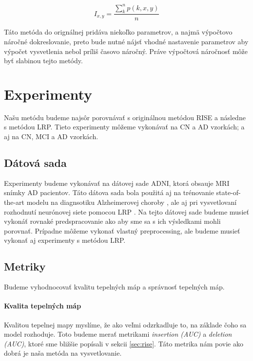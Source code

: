 \begin{equation}
    I_{x, y} = \frac{\sum_{k}^{n} p(k, x, y)}{n}
    \label{eq:risei_heatmap_1}
\end{equation}

Táto metóda do orignálnej pridáva niekoľko parametrov, a najmä výpočtovo náročné dokreslovanie, preto bude nutné nájsť vhodné nastavenie parametrov aby výpočet vysvetlenia nebol príliš časovo náročný. Práve výpočtová náročnosť môže byť slabinou tejto metódy.

\section{Experimenty}

Našu metódu budeme najsôr porovnávať s originálnou metódou RISE a následne s metódou LRP. Tieto experimenty môžeme vykonávať na CN a AD vzorkách; a aj na CN, MCI a AD vzorkách.

\subsection{Dátová sada} Experimenty budeme vykonávať na dátovej sade ADNI, ktorá obsauje MRI snímky AD pacientov. Táto dátova sada bola použitá aj na trénovanie state-of-the-art modelu na diagnsotiku Alzheimerovej choroby \cite{esmaeilzadeh2018end}, ale aj pri vysvetlovaní rozhodnutí neurónovej siete pomocou LRP \cite{bohle2019layer}. Na tejto dátovej sade budeme musieť vykonáť rovnaké predspracovanie ako \citeauthor*{bohle2019layer} aby sme sa s ich výsledkami mohli porovnať. Prípadne môžeme vykonať vlastný preprocessing, ale budeme musieť vykonať aj experimenty s metódou LRP.

\subsection{Metriky}

Budeme vyhodnocovať kvalitu tepelných máp a správnosť tepelných máp. 

\paragraph{Kvalita tepelných máp} Kvalitou tepelnej mapy myslíme, že ako veľmi odzrkadluje to, na základe čoho sa model rozhoduje. Toto budeme merať metrikami \textit{insertion (AUC)} a \textit{deletion (AUC)}, ktoré sme bližšie popísali v sekcii \ref{sec:rise}. Táto metrika nám povie ako dobrá je naša metóda na vysvetlovanie.

